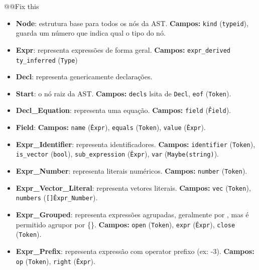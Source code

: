@@Fix this
\begin{itemize}
\item \textbf{Node}: estrutura base para todos os nós da AST.
      \textbf{Campos:}
      \texttt{kind} (\texttt{typeid}), guarda um número que indica qual o tipo do nó.

\item \textbf{Expr}: representa expressões de forma geral.
      \textbf{Campos:}
      \texttt{expr\_derived} \texttt{ty\_inferred} (\texttt{Type})

\item \textbf{Decl}: representa genericamente declarações.

\item \textbf{Start}: o nó raiz da AST.
      \textbf{Campos:}
      \texttt{decls} lsita de \texttt{Decl}, \texttt{eof} (\texttt{Token}).

\item \textbf{Decl\_Equation}: representa uma equação.
      \textbf{Campos:}
      \texttt{field} (\texttt{\^Field}).

\item \textbf{Field}:
      \textbf{Campos:}
      \texttt{name} (\texttt{\^Expr}), \texttt{equals} (\texttt{Token}), \texttt{value} (\texttt{\^Expr}).

\item \textbf{Expr\_Identifier}: representa identificadores.
      \textbf{Campos:}
      \texttt{identifier} (\texttt{Token}), \texttt{is\_vector} (\texttt{bool}),
      \texttt{sub\_expression} (\texttt{\^Expr}), \texttt{var} (\texttt{Maybe(string)}).

\item \textbf{Expr\_Number}: representa literais numéricos.
      \textbf{Campos:}
      \texttt{number} (\texttt{Token}).

\item \textbf{Expr\_Vector\_Literal}: representa vetores literais.
      \textbf{Campos:}
      \texttt{vec} (\texttt{Token}), \texttt{numbers} (\texttt{[]\^Expr\_Number}).

  \item \textbf{Expr\_Grouped}: representa expressões agrupadas, geralmente por \(\), mas é permitido agrupor por \{\}.
      \textbf{Campos:}
      \texttt{open} (\texttt{Token}), \texttt{expr} (\texttt{\^Expr}), \texttt{close} (\texttt{Token}).

  \item \textbf{Expr\_Prefix}: representa expressão com operator prefixo (ex: -3).
      \textbf{Campos:}
      \texttt{op} (\texttt{Token}), \texttt{right} (\texttt{\^Expr}).


\end{itemize}
